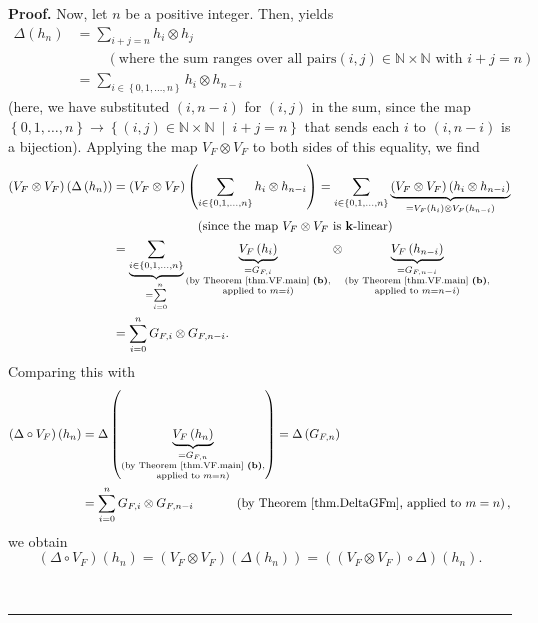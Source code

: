 \documentclass[numbers=enddot,12pt,final,onecolumn,notitlepage]{scrartcl}%
\theoremstyle{definition}
\newenvironment{proof}[1][Proof]{\noindent\textbf{#1.} }{\ \rule{0.5em}{0.5em}}
\let\sumnonlimits\sum
\renewcommand{\sum}{\sumnonlimits\limits}
\newenvironment{verlong}{}{}
\begin{document}
\begin{verlong}
\begin{proof}
Now, let $n$ be a positive integer. Then, \cite[Proposition 2.3.6(iii)]%
{GriRei} yields%
\begin{align*}
\Delta\left(  h_{n}\right)   &  =\sum_{i+j=n}h_{i}\otimes h_{j}\\
&  \ \ \ \ \ \ \ \ \ \ \left(  \text{where the sum ranges over all pairs
}\left(  i,j\right)  \in\mathbb{N}\times\mathbb{N}\text{ with }i+j=n\right) \\
&  =\sum_{i\in\left\{  0,1,\ldots,n\right\}  }h_{i}\otimes h_{n-i}%
\end{align*}
(here, we have substituted $\left(  i,n-i\right)  $ for $\left(  i,j\right)  $
in the sum, since the map $\left\{  0,1,\ldots,n\right\}  \rightarrow\left\{
\left(  i,j\right)  \in\mathbb{N}\times\mathbb{N}\ \mid\ i+j=n\right\}  $ that
sends each $i$ to $\left(  i,n-i\right)  $ is a bijection). Applying the map
$V_{F}\otimes V_{F}$ to both sides of this equality, we find%
\begin{align*}
\left(  V_{F}\otimes V_{F}\right)  \left(  \Delta\left(  h_{n}\right)
\right)   &  =\left(  V_{F}\otimes V_{F}\right)  \left(  \sum_{i\in\left\{
0,1,\ldots,n\right\}  }h_{i}\otimes h_{n-i}\right)  =\sum_{i\in\left\{
0,1,\ldots,n\right\}  }\underbrace{\left(  V_{F}\otimes V_{F}\right)  \left(
h_{i}\otimes h_{n-i}\right)  }_{=V_{F}\left(  h_{i}\right)  \otimes
V_{F}\left(  h_{n-i}\right)  }\\
&  \ \ \ \ \ \ \ \ \ \ \ \ \ \ \ \ \ \ \ \ \left(  \text{since the map }%
V_{F}\otimes V_{F}\text{ is }\mathbf{k}\text{-linear}\right) \\
&  =\underbrace{\sum_{i\in\left\{  0,1,\ldots,n\right\}  }}_{=\sum_{i=0}^{n}%
}\underbrace{V_{F}\left(  h_{i}\right)  }_{\substack{=G_{F,i}\\\text{(by
Theorem \ref{thm.VF.main} \textbf{(b)},}\\\text{applied to }m=i\text{)}%
}}\otimes\underbrace{V_{F}\left(  h_{n-i}\right)  }_{\substack{=G_{F,n-i}%
\\\text{(by Theorem \ref{thm.VF.main} \textbf{(b)},}\\\text{applied to
}m=n-i\text{)}}}\\
&  =\sum_{i=0}^{n}G_{F,i}\otimes G_{F,n-i}.
\end{align*}
Comparing this with%
\begin{align*}
\left(  \Delta\circ V_{F}\right)  \left(  h_{n}\right)   &  =\Delta\left(
\underbrace{V_{F}\left(  h_{n}\right)  }_{\substack{=G_{F,n}\\\text{(by
Theorem \ref{thm.VF.main} \textbf{(b)},}\\\text{applied to }m=n\text{)}%
}}\right)  =\Delta\left(  G_{F,n}\right) \\
&  =\sum_{i=0}^{n}G_{F,i}\otimes G_{F,n-i}\ \ \ \ \ \ \ \ \ \ \left(  \text{by
Theorem \ref{thm.DeltaGFm}, applied to }m=n\right)  ,
\end{align*}
we obtain%
\[
\left(  \Delta\circ V_{F}\right)  \left(  h_{n}\right)  =\left(  V_{F}\otimes
V_{F}\right)  \left(  \Delta\left(  h_{n}\right)  \right)  =\left(  \left(
V_{F}\otimes V_{F}\right)  \circ\Delta\right)  \left(  h_{n}\right)  .
\]



\end{proof}
\end{verlong}
\end{document}
